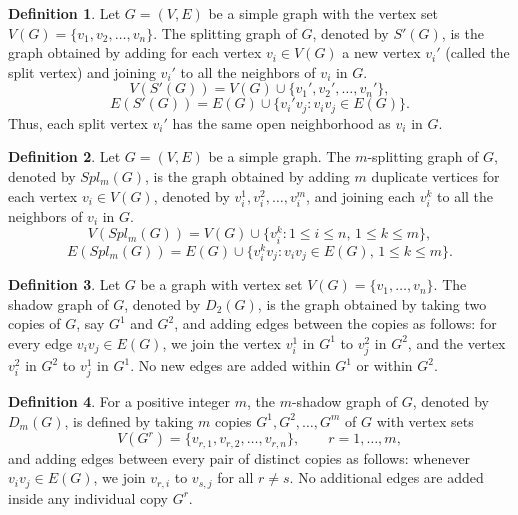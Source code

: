 \documentclass[12pt]{article}
\theoremstyle{plain}
\theoremstyle{remark}
\theoremstyle{definition}
\newtheorem{definition}{Definition}
\begin{document}
\begin{definition}
	Let $G=(V,E)$ be a simple graph with the vertex set $V(G)=\{v_1,v_2,\dots,v_n\}$. 
	The splitting graph of $G$, denoted by $S'(G)$, is the graph obtained by adding for each vertex $v_i \in V(G)$
	a new vertex $v_i'$ (called the split vertex) and joining $v_i'$ to all the neighbors of $v_i$ in $G$.
	\[
	V(S'(G)) = V(G) \cup \{v_1', v_2', \dots, v_n'\},
	\]
	\[
	E(S'(G)) = E(G) \cup \{ v_i'v_j : v_i v_j \in E(G) \}.
	\]
	Thus, each split vertex $v_i'$ has the same open neighborhood as $v_i$ in $G$.
\end{definition}
\begin{definition}
	Let $G=(V,E)$ be a simple graph. The $m$-splitting graph of $G$, denoted by $Spl_m(G)$, 
	is the graph obtained by adding $m$ duplicate vertices for each vertex $v_i \in V(G)$, denoted by 
	$v_i^1, v_i^2, \dots, v_i^m$, and joining each $v_i^k$ to all the neighbors of $v_i$ in $G$.
	\[
	V(Spl_m(G)) = V(G) \cup \{ v_i^k : 1 \le i \le n,\, 1 \le k \le m \},
	\]
	\[
	E(Spl_m(G)) = E(G) \cup \{ v_i^k v_j : v_i v_j \in E(G),\, 1 \le k \le m \}.
	\]
\end{definition}
\begin{definition}
	Let $G$ be a graph with vertex set $V(G)=\{v_1,\dots,v_n\}$.  
	The shadow graph of $G$, denoted by $D_2(G)$, is the graph obtained by taking two copies of $G$, say $G^1$ and $G^2$, and adding edges between the copies as follows: for every edge $v_i v_j\in E(G)$, we join the vertex $v_i^1$ in $G^1$ to $v_j^2$ in $G^2$, and the vertex $v_i^2$ in $G^2$ to $v_j^1$ in $G^1$. No new edges are added within $G^1$ or within $G^2$.
\end{definition}

\begin{definition}
	For a positive integer $m$, the {$m$-shadow graph} of $G$, denoted by $D_m(G)$, is defined by taking $m$ copies $G^1,G^2,\dots,G^m$ of $G$ with vertex sets
	\[
	V(G^r)=\{v_{r,1},v_{r,2},\dots,v_{r,n}\}, \qquad r=1,\dots,m,
	\]
	and adding edges between every pair of distinct copies as follows:
	whenever $v_i v_j \in E(G)$, we join $v_{r,i}$ to $v_{s,j}$ for all $r\ne s$.
	No additional edges are added inside any individual copy $G^r$.
\end{definition}
\end{document}
